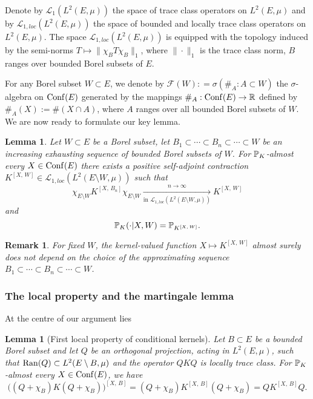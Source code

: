 \documentclass[12pt]{paper}
\newtheorem{lemma}[theorem]{Lemma}
\newtheorem*{remark*}{Remark}
\numberwithin{theorem}{section}
\numberwithin{figure}{section}
\numberwithin{equation}{section}
\begin{document}
Denote by $\mathscr{L}_1(L^2(E, \mu))$ the space of trace class operators on $L^2(E, \mu)$ and by  $\mathscr{L}_{1, loc}(L^2(E, \mu))$ the space of bounded and locally trace class operators on $L^2(E, \mu)$.
The space $\mathscr{L}_{1, loc}(L^2(E, \mu))$ is equipped with the topology induced by the  semi-norms $ T\mapsto \| \chi_B T\chi_B\|_1$, where $\| \cdot \|_1$ is the trace class norm, $B$ ranges over bounded Borel subsets of $E$.


For any Borel subset $W \subset E$, we denote by $\mathcal{F}(W): = \sigma (\#_A: A\subset W)$
 the $\sigma$-algebra on $\mathrm{Conf}(E)$ generated by the mappings $\#_A: \mathrm{Conf}(E) \rightarrow\mathbb{R}$ defined by $\#_A(X) := \#(X \cap A)$, where $A$ ranges over all bounded Borel subsets of $W$.
We are now ready to formulate our key lemma.

\begin{lemma}\label{key-lem}
Let $W\subset E$ be a Borel subset, let $B_1 \subset \cdots \subset B_n \subset \cdots \subset W$ be an increasing exhausting sequence of bounded Borel subsets of $W$. For $\mathbb{P}_K$-almost every $X\in \mathrm{Conf}(E)$  there exists a positive self-adjoint  contraction $K^{[X, \, W]} \in \mathscr{L}_{1, loc}(L^2(E\setminus W, \mu))$ such that
\[
\chi_{E\setminus W} K^{[X, \, B_n]} \chi_{E\setminus W} \xrightarrow[\text{in $\mathscr{L}_{1, loc}(L^2(E\setminus W, \mu))$}]{n\to\infty}  K^{[X, \, W]}
\]
and
\[
\mathbb{P}_K(\cdot | X, W) = \mathbb{P}_{K^{[X, \, W]}}.
\]
\end{lemma}


\begin{remark*}
For fixed $W$, the kernel-valued function $X \mapsto K^{[X, \, W]}$ almost surely does not depend on the choice of the approximating sequence $B_1 \subset \cdots \subset B_n \subset \cdots \subset W$.
\end{remark*}








 \subsubsection{The local property and the martingale lemma}

At the centre of our argument lies

\begin{lemma}[First local property of conditional kernels]\label{main-local}
Let $B\subset E$ be a  bounded Borel subset and  let  $Q$ be  an orthogonal projection, acting in $L^2(E, \mu)$,  such that
 $\mathrm{Ran}(Q) \subset L^2(E\setminus B, \mu)$ and the operator $QKQ$ is  locally trace class.
For $\mathbb{P}_K$-almost every $X\in \mathrm{Conf}(E)$, we have
\begin{equation}\label{bqk}
\Big((Q + \chi_B)K (Q+\chi_B)\Big)^{[X, \, B]} = (Q  + \chi_B )K^{[X, \, B]} (Q  + \chi_B) =  Q K^{[X, \, B]} Q.
\end{equation}
\end{lemma}
\end{document}

